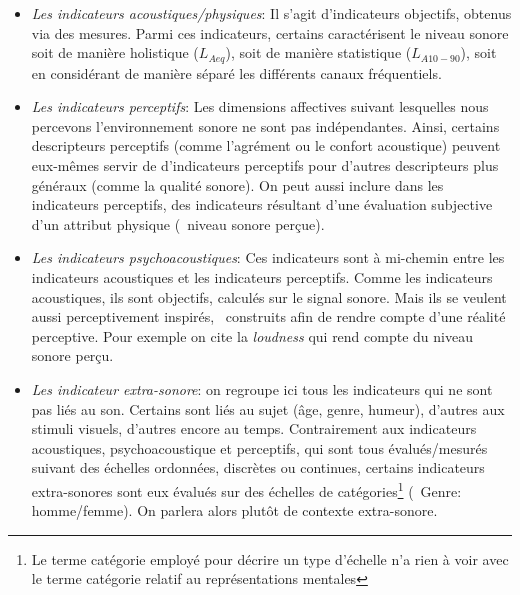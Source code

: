 \begin{itemize}
\begin{itemize}
\item \emph{Les indicateurs acoustiques/physiques}: Il s'agit d'indicateurs objectifs, obtenus via des mesures. Parmi ces indicateurs, certains caractérisent le niveau sonore soit de manière holistique ($L_{Aeq}$), soit de manière statistique ($L_{A10-90}$), soit en considérant de manière séparé les différents canaux fréquentiels. 

\item \emph{Les indicateurs perceptifs}: Les dimensions affectives suivant lesquelles nous percevons l'environnement sonore ne sont pas indépendantes. Ainsi, certains descripteurs perceptifs (comme l'agrément ou le confort acoustique) peuvent eux-mêmes servir de d'indicateurs perceptifs pour d'autres descripteurs plus généraux (comme la qualité sonore). On peut aussi inclure dans les indicateurs perceptifs, des indicateurs résultant d'une évaluation subjective d'un attribut physique (\eg~niveau sonore perçue). 
\item \emph{Les indicateurs psychoacoustiques}: Ces indicateurs sont à mi-chemin entre les indicateurs acoustiques et les indicateurs perceptifs. Comme les indicateurs acoustiques, ils sont objectifs, calculés sur le signal sonore. Mais ils se veulent aussi perceptivement inspirés, \ie~construits afin de rendre compte d'une réalité perceptive.  Pour exemple on cite la \emph{loudness} qui rend compte du niveau sonore perçu.
\item \emph{Les indicateur extra-sonore}: on regroupe ici tous les indicateurs qui ne sont pas liés au son. Certains sont liés au sujet (âge, genre, humeur), d'autres aux stimuli visuels, d'autres encore au temps. Contrairement aux indicateurs acoustiques, psychoacoustique et perceptifs, qui sont tous évalués/mesurés suivant des échelles ordonnées, discrètes ou continues, certains indicateurs extra-sonores sont eux évalués sur des échelles de catégories\footnote{Le terme catégorie employé pour décrire un type d'échelle n'a rien à voir avec le terme catégorie relatif au représentations mentales} (\eg~Genre: homme/femme). On parlera alors plutôt de contexte extra-sonore.
\end{itemize}

\end{itemize}

